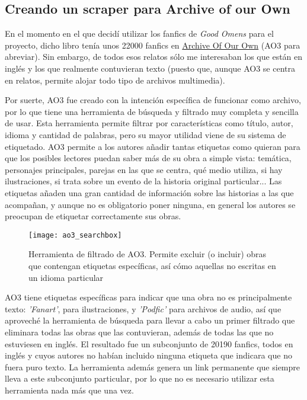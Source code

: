 \documentclass{pre-tfg}
\begin{document}
\subsection{Creando un scraper para Archive of our Own}
\label{sec:recogidadatos}

En el momento en el que decidí utilizar los fanfics de \textit{Good Omens} para el proyecto, dicho libro tenía unos 22000 fanfics en \href{archiveofourown.org}{Archive Of Our Own} (AO3 para abreviar). Sin embargo, de todos esos relatos sólo me interesaban los que están en inglés y los que realmente contuvieran texto (puesto que, aunque AO3 se centra en relatos, permite alojar todo tipo de archivos multimedia).

Por suerte, AO3 fue creado con la intención específica de funcionar como archivo, por lo que tiene una herramienta de búsqueda y filtrado muy completa y sencilla de usar. Esta herramienta permite filtrar por características como título, autor, idioma y cantidad de palabras, pero su mayor utilidad viene de su sistema de etiquetado. AO3 permite a los autores añadir tantas etiquetas como quieran para que los posibles lectores puedan saber más de su obra a simple vista: temática, personajes principales, parejas en las que se centra, qué medio utiliza, si hay ilustraciones, si trata sobre un evento de la historia original particular... Las etiquetas añaden una gran cantidad de información sobre las historias a las que acompañan, y aunque no es obligatorio poner ninguna, en general los autores se preocupan de etiquetar correctamente sus obras.

\begin{SCfigure}
	\caption{Herramienta de filtrado de AO3. Permite excluir (o incluir) obras que contengan etiquetas específicas, así cómo aquellas no escritas en un idioma particular}
	\label{fig:ao3_search}
	\texttt{[image: ao3\_searchbox]}
	\centering
\end{SCfigure}

AO3 tiene etiquetas específicas para indicar que una obra no es principalmente texto: \textit{'Fanart'}, para ilustraciones, y \textit{'Podfic'} para archivos de audio, así que aproveché la herramienta de búsqueda para llevar a cabo un primer filtrado que eliminara todas las obras que las contuvieran, además de todas las que no estuviesen en inglés. El resultado fue un subconjunto de 20190 fanfics, todos en inglés y cuyos autores no habían incluido ninguna etiqueta que indicara que no fuera puro texto. La herramienta además genera un link permanente que siempre lleva a este subconjunto particular, por lo que no es necesario utilizar esta herramienta nada más que una vez.
\end{document}
